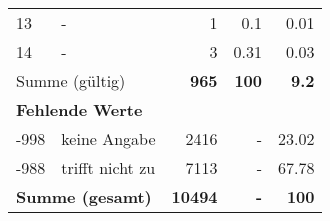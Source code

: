 \begin{longtable}{lXrrr}
     13 &
     \multicolumn{1}{X}{ -  } &


       \num{1} &
       \num[round-mode=places,round-precision=2]{0.1} &
         \num[round-mode=places,round-precision=2]{0.01} \\

     14 &
     \multicolumn{1}{X}{ -  } &


       \num{3} &
       \num[round-mode=places,round-precision=2]{0.31} &
         \num[round-mode=places,round-precision=2]{0.03} \\
     \midrule
     \multicolumn{2}{l}{Summe (gültig)} &
       \textbf{\num{965}} &
     \textbf{\num{100}} &
       \textbf{\num[round-mode=places,round-precision=2]{9.2}} \\
     \multicolumn{5}{l}{\textbf{Fehlende Werte}}\\
       -998 &
       keine Angabe &
         \num{2416} &
        - &
         \num[round-mode=places,round-precision=2]{23.02} \\
       -988 &
       trifft nicht zu &
         \num{7113} &
        - &
         \num[round-mode=places,round-precision=2]{67.78} \\
     \midrule
     \multicolumn{2}{l}{\textbf{Summe (gesamt)}} &
          \textbf{\num{10494}} &
        \textbf{-} &
        \textbf{\num{100}} \\
     \bottomrule
     \end{longtable}
     
